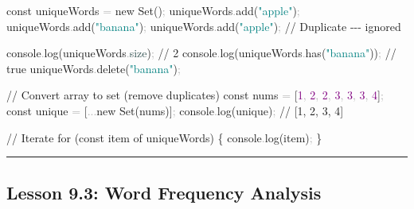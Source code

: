 \documentclass[
  justified,
  openright,
]{tufte-book}
\newcommand{\AttributeTok}[1]{\textcolor{DarkSlateGray}{#1}}
\newcommand{\BuiltInTok}[1]{#1}
\newcommand{\CommentTok}[1]{\textcolor{MidGray}{#1}}
\newcommand{\ControlFlowTok}[1]{\textcolor{BrandBlue}{#1}}
\newcommand{\DecValTok}[1]{\textcolor{Purple}{#1}}
\newcommand{\FunctionTok}[1]{\textcolor{BrandBlue}{#1}}
\newcommand{\KeywordTok}[1]{\textcolor{BrandBlue}{#1}}
\newcommand{\NormalTok}[1]{#1}
\newcommand{\OperatorTok}[1]{\textcolor{DarkGray}{#1}}
\newcommand{\StringTok}[1]{\textcolor{Teal}{#1}}
\newenvironment{Shaded}{%
  \begin{snugshade}
}{%
  \end{snugshade}
}
\begin{document}
\begin{Shaded}
\begin{Highlighting}[]
\KeywordTok{const}\NormalTok{ uniqueWords }\OperatorTok{=} \KeywordTok{new} \BuiltInTok{Set}\NormalTok{()}\OperatorTok{;}
\NormalTok{uniqueWords}\OperatorTok{.}\FunctionTok{add}\NormalTok{(}\StringTok{"apple"}\NormalTok{)}\OperatorTok{;}
\NormalTok{uniqueWords}\OperatorTok{.}\FunctionTok{add}\NormalTok{(}\StringTok{"banana"}\NormalTok{)}\OperatorTok{;}
\NormalTok{uniqueWords}\OperatorTok{.}\FunctionTok{add}\NormalTok{(}\StringTok{"apple"}\NormalTok{)}\OperatorTok{;} \CommentTok{// Duplicate {-}{-}{-} ignored}

\BuiltInTok{console}\OperatorTok{.}\FunctionTok{log}\NormalTok{(uniqueWords}\OperatorTok{.}\AttributeTok{size}\NormalTok{)}\OperatorTok{;} \CommentTok{// 2}
\BuiltInTok{console}\OperatorTok{.}\FunctionTok{log}\NormalTok{(uniqueWords}\OperatorTok{.}\FunctionTok{has}\NormalTok{(}\StringTok{"banana"}\NormalTok{))}\OperatorTok{;} \CommentTok{// true}
\NormalTok{uniqueWords}\OperatorTok{.}\FunctionTok{delete}\NormalTok{(}\StringTok{"banana"}\NormalTok{)}\OperatorTok{;}

\CommentTok{// Convert array to set (remove duplicates)}
\KeywordTok{const}\NormalTok{ nums }\OperatorTok{=}\NormalTok{ [}\DecValTok{1}\OperatorTok{,} \DecValTok{2}\OperatorTok{,} \DecValTok{2}\OperatorTok{,} \DecValTok{3}\OperatorTok{,} \DecValTok{3}\OperatorTok{,} \DecValTok{3}\OperatorTok{,} \DecValTok{4}\NormalTok{]}\OperatorTok{;}
\KeywordTok{const}\NormalTok{ unique }\OperatorTok{=}\NormalTok{ [}\OperatorTok{...}\KeywordTok{new} \BuiltInTok{Set}\NormalTok{(nums)]}\OperatorTok{;}
\BuiltInTok{console}\OperatorTok{.}\FunctionTok{log}\NormalTok{(unique)}\OperatorTok{;} \CommentTok{// [1, 2, 3, 4]}

\CommentTok{// Iterate}
\ControlFlowTok{for}\NormalTok{ (}\KeywordTok{const}\NormalTok{ item }\KeywordTok{of}\NormalTok{ uniqueWords) \{}
  \BuiltInTok{console}\OperatorTok{.}\FunctionTok{log}\NormalTok{(item)}\OperatorTok{;}
\NormalTok{\}}
\end{Highlighting}
\end{Shaded}

\begin{center}\rule{0.5\linewidth}{0.5pt}\end{center}

\subsection{Lesson 9.3: Word Frequency
Analysis}\label{lesson-9.3-word-frequency-analysis}
\end{document}
